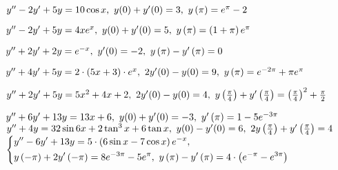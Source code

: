 \begin{enumtasks}
		\label{bvp_green:green_lifting_hard}
		\item \( y'' - 2 y' + 5 y = 10 \cos{x}, ~ y(0) + y'(0) = 3, ~ y\left( \pi \right) = e^{\pi} - 2 \) %
		\item \( y'' - 2 y' + 5 y = 4 x e^x, ~ y(0) + y'(0) = 5, ~ y\left( \pi \right) = \left( 1 + \pi \right) e^{\pi} \) %
		\item \( y'' + 2 y' + 2 y = e^{-x}, ~ y'(0) = -2, ~ y\left( \pi \right) - y'\left( \pi \right) = 0 \) %
		\item \( y'' + 4 y' + 5 y = 2 \cdot \left( 5x + 3 \right) \cdot e^x, ~ 2y'(0) - y(0) = 9, ~ y\left( \pi \right) = e^{-2\pi} + \pi e^{\pi} \) %
		\item \( y'' + 2 y' + 5 y = 5 x^2 + 4 x + 2, ~ 2y'(0) - y(0) = 4, ~ y\left( \frac{\pi}{4} \right) + y'\left( \frac{\pi}{4} \right) = \left( \frac{\pi}{4} \right)^2 + \frac{\pi}{2} \) %
		\item \( y'' + 6 y' + 13 y = 13 x + 6, ~ y(0) + y'(0) = -3, ~ y'\left( \pi \right) = 1 - 5e^{-3 \pi} \) %
		\itemstar \( y'' + 4 y = 32 \sin{6 x} + 2 \tan^3{x} + 6 \tan{x}, ~ y(0) - y'(0) = 6, ~ 2 y\left( \frac{\pi}{4} \right) + y'\left( \frac{\pi}{4} \right) = 4 \) %
		\itemstar \( \left\lbrace \begin{aligned} &y'' - 6 y' + 13 y = 5 \cdot \left( 6 \sin{x} - 7 \cos{x} \right) e^{- x}, \\ &y\left( -\pi \right) + 2 y'\left( -\pi \right) = 8 e^{-3\pi} - 5 e^{\pi}, ~ y\left( \pi \right) - y'\left( \pi \right) = 4 \cdot \left( e^{-\pi} - e^{3\pi} \right) \end{aligned} \right. \) %

	\end{enumtasks}


